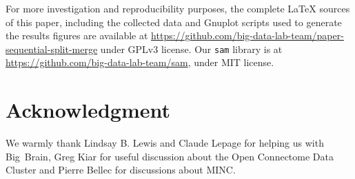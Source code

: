 \documentclass[10pt, conference, compsocconf]{IEEEtran}
\begin{document}
For more investigation and reproducibility purposes, the complete \LaTeX
sources of this paper, including the collected data and Gnuplot
scripts used to generate the results figures are available at
\url{https://github.com/big-data-lab-team/paper-sequential-split-merge}
under GPLv3 license. Our \texttt{sam} library is at
\url{https://github.com/big-data-lab-team/sam}, under MIT license.


\section*{Acknowledgment}
We warmly thank Lindsay B. Lewis and Claude Lepage for helping us with
Big~Brain, Greg Kiar for useful discussion about the Open
Connectome Data Cluster and Pierre Bellec for discussions about MINC.



\end{document}
